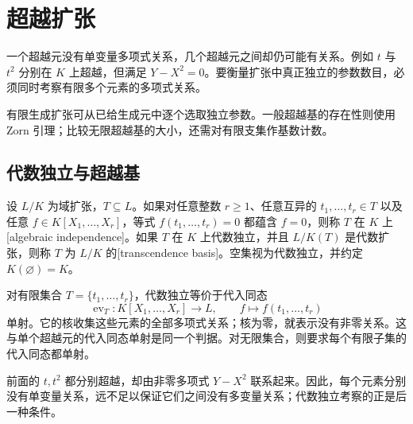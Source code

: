 
\section{超越扩张}
\label{b1:sec:1403}


%
%

一个超越元没有单变量多项式关系，几个超越元之间却仍可能有关系。例如 \(t\) 与 \(t^2\) 分别在 \(K\) 上超越，但满足 \(Y-X^2=0\)。要衡量扩张中真正独立的参数数目，必须同时考察有限多个元素的多项式关系。

\ProseParagraphBreak
有限生成扩张可从已给生成元中逐个选取独立参数。一般超越基的存在性则使用 Zorn 引理；比较无限超越基的大小，还需对有限支集作基数计数。

\subsection{代数独立与超越基}
\label{b1:subsec:1403:01}

\begin{definition}\label{b1:def:transcendence-basis}
	设 \(L/K\) 为域扩张，\(T\subseteq L\)。如果对任意整数 \(r\geq1\)、任意互异的 \(t_1,\ldots,t_r\in T\) 以及任意 \(f\in K[X_1,\ldots,X_r]\)，等式 \(f(t_1,\ldots,t_r)=0\) 都蕴含 \(f=0\)，则称 \(T\) 在 \(K\) 上[algebraic independence]。如果 \(T\) 在 \(K\) 上代数独立，并且 \(L/K(T)\) 是代数扩张，则称 \(T\) 为 \(L/K\) 的[transcendence basis]。空集视为代数独立，并约定 \(K(\varnothing)=K\)。
\end{definition}

对有限集合 \(T=\{t_1,\ldots,t_r\}\)，代数独立等价于代入同态
\[
	\operatorname{ev}_T:K[X_1,\ldots,X_r]\longrightarrow L, \qquad f\longmapsto f(t_1,\ldots,t_r)
\]
单射。它的核收集这些元素的全部多项式关系；核为零，就表示没有非零关系。这与单个超越元的代入同态单射是同一个判据。对无限集合，则要求每个有限子集的代入同态都单射。

\ProseParagraphBreak
前面的 \(t,t^2\) 都分别超越，却由非零多项式 \(Y-X^2\) 联系起来。因此，每个元素分别没有单变量关系，远不足以保证它们之间没有多变量关系；代数独立考察的正是后一种条件。

